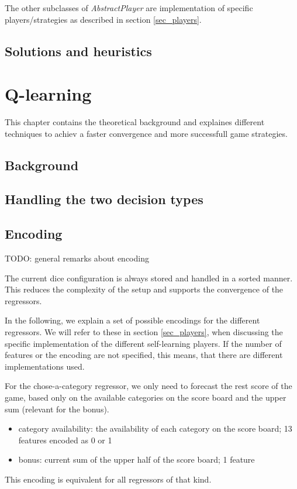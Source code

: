 \documentclass{article}
\begin{document}
The other subclasses of \emph{AbstractPlayer} are implementation of 
specific players/strategies as described in section \ref{sec_players}.

\subsection{Solutions and heuristics}


\section{Q-learning}
This chapter contains the theoretical background and 
explaines different techniques to achiev a faster convergence and more successfull game strategies.

\subsection{Background}
\subsection{Handling the two decision types}

\subsection{Encoding}
TODO: general remarks about encoding

The current dice configuration is always stored and handled in a sorted manner.
This reduces the complexity of the setup and supports the convergence of the regressors.

In the following, we explain a set of possible encodings for the different regressors.
We will refer to these in section \ref{sec_players},
when discussing the specific implementation of the different self-learning players.
If the number of features or the encoding are not specified, this means, that there are different implementations used.

For the chose-a-category regressor, we only need to forecast the rest score of the game,
based only on the available categories on the score board and the upper sum (relevant for the bonus).
\begin{itemize}
\item category availability: the availability of each category on the score board; 13 features encoded as 0 or 1
\item bonus: current sum of the upper half of the score board; 1 feature
\end{itemize}
This encoding is equivalent for all regressors of that kind.
\end{document}
